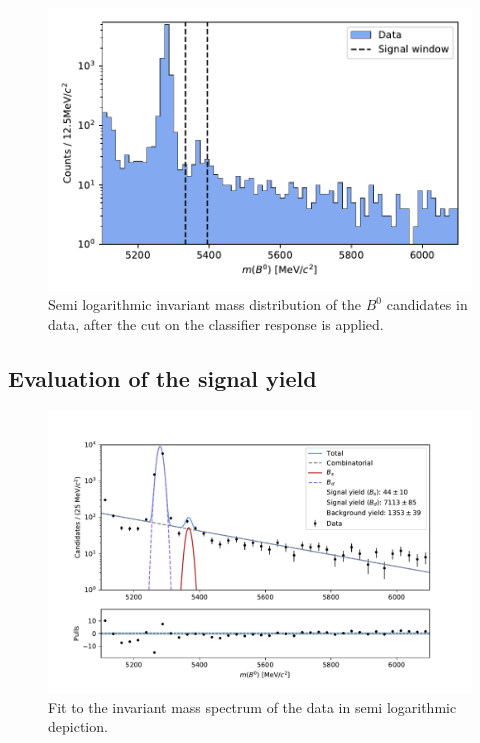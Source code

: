 \begin{figure}
  \centering
  \includegraphics[width = .8\textwidth]{"content/plots/mass_after_BDT.pdf"}
  \caption{Semi logarithmic invariant mass distribution of the $B^0$ candidates in data, after the cut on the classifier response is applied.}
  \label{fig:mass_after_BDT}
\end{figure}

\subsection{Evaluation of the signal yield}

\begin{figure}
  \centering
  \includegraphics[width = .9\textwidth]{"content/plots/final_fit.pdf"}
  \caption{Fit to the invariant mass spectrum of the data in semi logarithmic depiction.}
  \label{fig:fit}
\end{figure}

